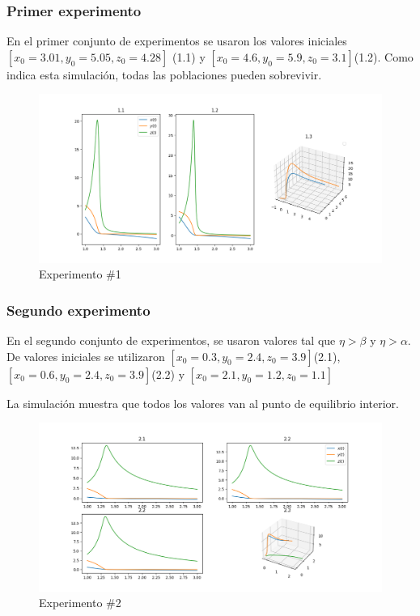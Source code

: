 \documentclass[12pt, a4paper]{article}
\begin{document}
\subsubsection*{Primer experimento}

En el primer conjunto de experimentos se usaron los valores iniciales $[x_0=3.01, y_0=5.05, z_0=4.28]$ (1.1)
y $[x_0=4.6, y_0=5.9, z_0=3.1]$(1.2). Como indica esta simulación, todas las poblaciones
pueden sobrevivir.

\begin{figure}[h!]
    \includegraphics[width=\linewidth]{../images/1.png}
    \caption{Experimento \#1}
\end{figure}

\subsubsection*{Segundo experimento}

En el segundo conjunto de experimentos, se usaron valores tal que $\eta > \beta$ y $\eta > \alpha$. 
De valores iniciales se utilizaron $[x_0=0.3, y_0=2.4, z_0=3.9]$(2.1),
$[x_0=0.6, y_0=2.4, z_0=3.9]$(2.2) y $[x_0=2.1, y_0=1.2, z_0=1.1]$

La simulación muestra que todos los valores van al punto de equilibrio interior.

\begin{figure}[h!]
    \includegraphics[width=\linewidth]{../images/2.png}
    \caption{Experimento \#2}
\end{figure}
\end{document}
